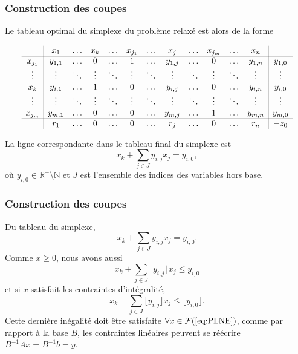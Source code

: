 \documentclass[usepdftitle=false, aspectratio=169]{beamer}
\def\cF{\mathcal{F}}
\begin{document}
\begin{frame}
\frametitle{Construction des coupes}

Le tableau optimal du simplexe du problème relaxé est alors de la forme
\begin{footnotesize}
$$
\begin{array}{c|ccccccccccc|c}
& x_1 & \ldots & x_k & \ldots & x_{j_1}& \ldots & x_j & \ldots & x_{j_m} & \ldots & x_n & \\
\hline
x_{j_1}& y_{1,1} & \ldots & 0 & \ldots & 1 & \ldots & y_{1,j} & \ldots & 0 & \ldots & y_{1,n} & y_{1,0} \\
\vdots & \vdots & \ddots & \vdots & \ddots & \vdots & \ddots & \vdots & \ddots & \vdots & \ddots & \vdots & \vdots \\
x_k & y_{i,1} & \ldots & 1 & \ldots & 0 & \ldots & y_{i,j} & \ldots & 0 & \ldots & y_{i,n} & y_{i,0} \\
\vdots & \vdots & \ddots & \vdots & \ddots & \vdots & \ddots & \vdots & \ddots & \vdots & \ddots & \vdots & \vdots \\
x_{j_m} & y_{m,1} & \ldots & 0 & \ldots & 0 & \ldots & y_{m,j} & \ldots & 1 & \ldots & y_{m,n} & y_{m,0} \\
\hline
& r_1 & \ldots & 0 & \ldots & 0 & \ldots & r_j & \ldots & 0 & \ldots & r_n & -z_0
\end{array}
$$
\end{footnotesize}

La ligne correspondante dans le tableau final du simplexe est
$$
x_k + \sum_{j \in J} y_{i,j}x_j = y_{i,0},
$$
où $y_{i,0} \in \mathbb{R}^+ \setminus \mathbb{N}$ et $J$ est l'ensemble des indices des variables hors base.

\end{frame}

\begin{frame}
\frametitle{Construction des coupes}

Du tableau du simplexe,
\begin{equation}
x_k + \sum_{j \in J} y_{i,j}x_j = y_{i,0}.
\label{eq:cut1}
\end{equation}
Comme $x \geq 0$, nous avons aussi
$$
x_k + \sum_{j \in J} \lfloor y_{i,j} \rfloor x_j \leq y_{i,0}
$$
et si $x$ satisfait les contraintes d'intégralité,
\begin{equation}
x_k + \sum_{j \in J} \lfloor y_{i,j} \rfloor x_j \leq \lfloor y_{i,0} \rfloor.
	\label{eq:cut2}
\end{equation}
Cette dernière inégalité doit être satisfaite $\forall x \in \cF(\ref{eq:PLNE})$, comme par rapport à la base $B$, les contraintes linéaires peuvent se réécrire $B^{-1}Ax = B^{-1}b = y$.

\end{frame}
\end{document}

